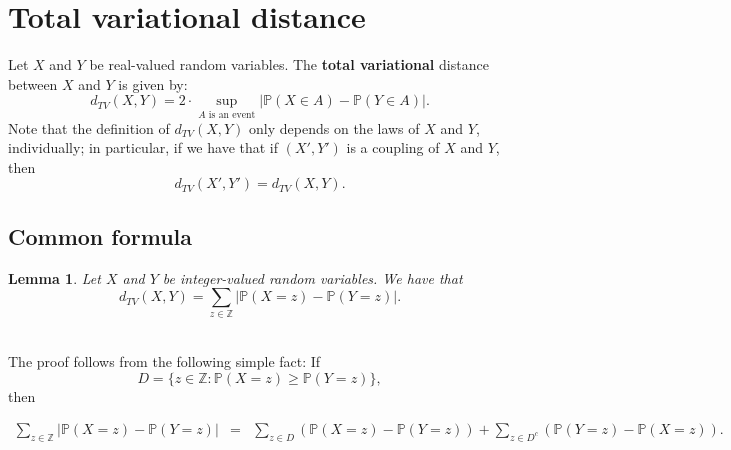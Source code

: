 \documentclass[
]{article}
\newtheorem{lemma}{Lemma}[section]
\theoremstyle{definition}
\theoremstyle{definition}
\theoremstyle{definition}
\theoremstyle{remark}
\begin{document}
\hypertarget{total-variational-distance}{%
\section{Total variational distance}\label{total-variational-distance}}

Let \(X\) and \(Y\) be real-valued random variables. The \textbf{total variational} distance between \(X\) and \(Y\) is given by:\\
\[d_{TV}(X,Y) = 2 \cdot \sup_{A  \text{ is an event}} | \mathbb{P}(X \in A) - \mathbb{P}(Y \in A)|.\] Note that the definition of \(d_{TV}(X,Y)\) only depends on the laws of \(X\) and \(Y\), individually; in particular, if we have that if \((X',Y')\) is a coupling of \(X\) and \(Y\), then \[d_{TV}(X',Y') = d_{TV}(X,Y).\]

\hypertarget{common-formula}{%
\subsection{Common formula}\label{common-formula}}

\begin{lemma}
\protect\hypertarget{lem:unnamed-chunk-5}{}{\label{lem:unnamed-chunk-5} } Let \(X\) and \(Y\) be integer-valued random variables. We have that
\[d_{TV}(X,Y) = \sum_{z \in \mathbb{Z}} | \mathbb{P}(X=z) - \mathbb{P}(Y=z)|.\]\\
\end{lemma}

The proof follows from the following simple fact:
If \[D = \{z \in \mathbb{Z}:  \mathbb{P}(X =z) \geq \mathbb{P}(Y=z)\},\] then

\begin{eqnarray*} \sum_{z \in \mathbb{Z}} | \mathbb{P}(X=z) - \mathbb{P}(Y=z)| 
&=& \sum_{z \in D} (\mathbb{P}(X=z) - \mathbb{P}(Y=z))+\sum_{z \in D^c} (\mathbb{P}(Y=z) - \mathbb{P}(X=z)).
\end{eqnarray*}
\end{document}
